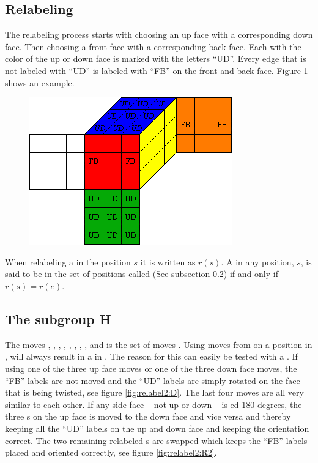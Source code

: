 \subsection{Relabeling}
The relabeling process  starts with choosing an up face with a corresponding down face. Then choosing a front face with a corresponding back face. Each \facelet{} with the color of the up or down face is marked with the letters ``UD''.  %
Every edge \cpiece{} that is not labeled with "`UD"' is labeled with "`FB"' on the front and back face.
Figure \ref{fig:relabelClean} shows an example.
\begin{figure}[!hbt]
	\centering
		\includegraphics[scale = 0.8]{input/pics/relabelClean}
	\caption{}
	\label{fig:relabelClean}
\end{figure}
When relabeling a \rubik{} in the position $s$ it is written as $r(s)$. A \rubik{} in any position, $s$, is said to be in the set of positions called (See subsection \ref{sub:theSubgroupH}) if and only if $r(s)=r(e)$.

\subsection{The subgroup H}
\label{sub:theSubgroupH}
The moves , , , , , , , ,  and  is the set of moves . Using moves from  on a position in , will always result in a \rubik{} in . The reason for this can easily be tested with a \rubik{}. If using one of the three up face moves or one of the three down face moves, the ``FB'' labels are not moved and the ``UD'' labels are simply rotated on the face that is being twisted, see figure \ref{fig:relabel2:D}. The last four moves are all very similar to each other. If any side face -- not up or down -- is \twist{}ed 180 degrees, the three \facelet{}s on the up face is moved to the down face and vice versa and thereby keeping all the ``UD'' labels on the up and down face and keeping the orientation correct. The two remaining relabeled \facelet{}s are swapped which keeps the ``FB'' labels placed and oriented correctly, see figure \ref{fig:relabel2:R2}.


